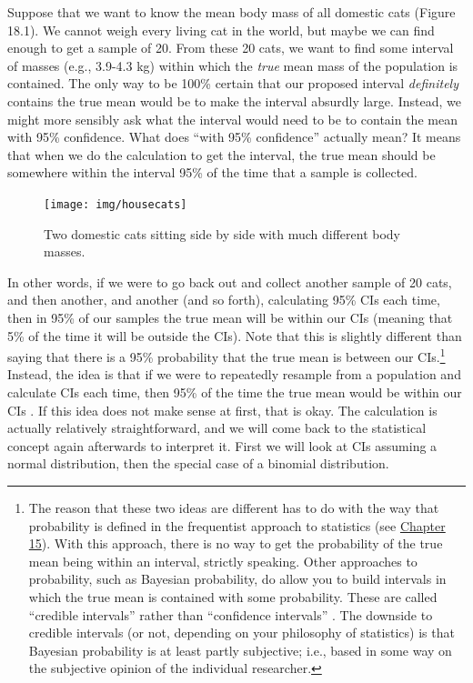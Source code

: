 \documentclass[
  openany]{krantz}
\begin{document}
Suppose that we want to know the mean body mass of all domestic cats (Figure 18.1).
We cannot weigh every living cat in the world, but maybe we can find enough to get a sample of 20.
From these 20 cats, we want to find some interval of masses (e.g., 3.9-4.3 kg) within which the \emph{true} mean mass of the population is contained.
The only way to be 100\% certain that our proposed interval \emph{definitely} contains the true mean would be to make the interval absurdly large.
Instead, we might more sensibly ask what the interval would need to be to contain the mean with 95\% confidence.
What does ``with 95\% confidence'' actually mean?
It means that when we do the calculation to get the interval, the true mean should be somewhere within the interval 95\% of the time that a sample is collected.

\begin{figure}
\texttt{[image: img/housecats]} \caption{Two domestic cats sitting side by side with much different body masses.}\label{fig:unnamed-chunk-75}
\end{figure}

In other words, if we were to go back out and collect another sample of 20 cats, and then another, and another (and so forth), calculating 95\% CIs each time, then in 95\% of our samples the true mean will be within our CIs (meaning that 5\% of the time it will be outside the CIs).
Note that this is slightly different than saying that there is a 95\% probability that the true mean is between our CIs.\footnote{The reason that these two ideas are different has to do with the way that probability is defined in the frequentist approach to statistics (see \protect\hyperlink{Chapter_15}{Chapter 15}). With this approach, there is no way to get the probability of the true mean being within an interval, strictly speaking. Other approaches to probability, such as Bayesian probability, do allow you to build intervals in which the true mean is contained with some probability. These are called ``credible intervals'' rather than ``confidence intervals'' \citep[e.g.,][]{Ellison2004}. The downside to credible intervals (or not, depending on your philosophy of statistics) is that Bayesian probability is at least partly subjective; i.e., based in some way on the subjective opinion of the individual researcher.}
Instead, the idea is that if we were to repeatedly resample from a population and calculate CIs each time, then 95\% of the time the true mean would be within our CIs \citep{Sokal1995}.
If this idea does not make sense at first, that is okay.
The calculation is actually relatively straightforward, and we will come back to the statistical concept again afterwards to interpret it.
First we will look at CIs assuming a normal distribution, then the special case of a binomial distribution.
\end{document}
